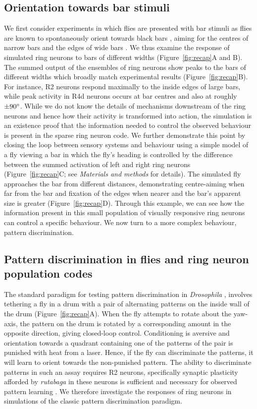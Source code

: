 \subsection*{Orientation towards bar stimuli}
We first consider experiments in which flies are presented with bar stimuli as flies are known to spontaneously orient towards black bars \cite{Gotz1987}, aiming for the centres of narrow bars and the edges of wide bars \cite{Osorio1990}. We thus examine the response of simulated ring neurons to bars of different widths (Figure~\ref{fig:recap}A and B). The summed output of the ensembles of ring neurons show peaks to the bars of different widths which broadly match experimental results (Figure~\ref{fig:recap}B). For instance, R2 neurons respond maximally to the inside edges of large bars, while peak activity in R4d neurons occurs at bar centres and also at roughly $\pm 90\degree$. While we do not know the details of mechanisms downstream of the ring neurons and hence how their activity is transformed into action, the simulation is an existence proof that the information needed to control the observed behaviour is present in the sparse ring neuron code. 
We further demonstrate this point by closing the loop between sensory systems and behaviour using a simple model of a fly viewing a bar in which the fly’s heading is controlled by the difference between the summed activation of left and right ring neurons (Figure~\ref{fig:recap}C; see \emph{Materials and methods} for details). The simulated fly approaches the bar from different distances, demonstrating centre-aiming when far from the bar and fixation of the edges when nearer and the bar’s apparent size is greater (Figure~\ref{fig:recap}D). Through this example, we can see how the information present in this small population of visually responsive ring neurons can control a specific behaviour. We now turn to a more complex behaviour, pattern discrimination. 

\subsection*{Pattern discrimination in flies and ring neuron population codes}
The standard paradigm for testing pattern discrimination in \emph{Drosophila} \cite{Pan2009,Liu2006,Ernst1999,Dill1993}, involves tethering a fly in a drum with a pair of alternating patterns on the inside wall of the drum (Figure~\ref{fig:recap}A). When the fly attempts to rotate about the yaw-axis, the pattern on the drum is rotated by a corresponding amount in the opposite direction, giving closed-loop control. Conditioning is aversive and orientation towards a quadrant containing one of the patterns of the pair is punished with heat from a laser. Hence, if the fly can discriminate the patterns, it will learn to orient towards the non-punished pattern. The ability to discriminate patterns in such an assay requires R2 neurons, specifically synaptic plasticity afforded by \emph{rutabaga} in these neurons is sufficient and necessary for observed pattern learning \cite{Pan2009,Wang2008,Liu2006,Ernst1999}. We therefore investigate the responses of ring neurons in simulations of the classic pattern discrimination paradigm.

